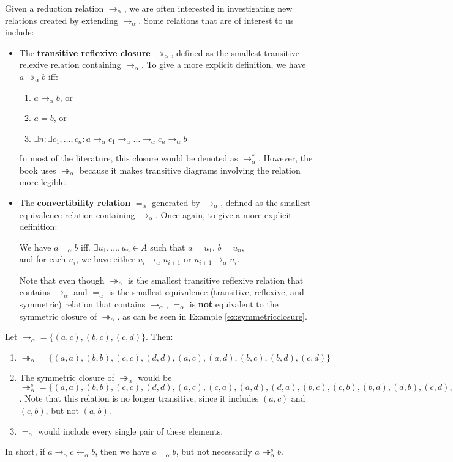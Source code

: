 \documentclass{report}
\newcommand{\trans}{\twoheadrightarrow}
\begin{document}
%
\begin{definition}
Given a reduction relation $\to_{\alpha}$, we are often interested in investigating new relations created by extending $\to_{\alpha}$. Some relations that are of interest to us include:
\begin{itemize}
 \item The \textbf{transitive reflexive closure} $\trans_\alpha$, defined as the smallest transitive relexive relation containing $\to_\alpha$. To give a more explicit definition, we have $a \twoheadrightarrow_\alpha b$ iff:
  \begin{enumerate}
   \item $a \to_\alpha b$, or
   \item $a = b$, or
   \item $\exists n : \exists c_1, \hdots, c_n : a \to_\alpha c_1 \to_\alpha \hdots \to_\alpha c_n \to_\alpha b$
  \end{enumerate}
  In most of the literature, this closure would be denoted as $\to_\alpha^*$. However, the book uses $\trans_\alpha$ because it makes transitive diagrams involving the relation more legible.\
  \item The \textbf{convertibility relation} $=_\alpha$ generated by $\to_\alpha$, defined as the smallest equivalence relation containing $\to_\alpha$. Once again, to give a more explicit definition:
  \begin{center}
   We have $a =_\alpha b$ iff. $\exists u_1, \hdots, u_n \in A$ such that $a = u_1$, $b = u_n$,\\ and for each $u_i$, we have either $u_i \to_\alpha u_{i+1}$ or $u_{i+1} \to_\alpha u_i$.
  \end{center}
  Note that even though $\trans_\alpha$ is the smallest transitive reflexive relation that contains $\to_\alpha$ and $=_\alpha$ is the smallest equivalence (transitive, reflexive, and symmetric) relation that contains $\to_\alpha$, $=_\alpha$ is \textbf{not} equivalent to the symmetric closure of $\trans_\alpha$, as can be seen in Example \ref{ex:symmetricclosure}.
\end{itemize}
%
\begin{example}
\label{ex:symmetricclosure}
Let $\to_\alpha = \{(a,c), (b,c), (c,d)\}$. Then:
\begin{enumerate}
 \item $\trans_\alpha = \{(a,a), (b,b), (c,c), (d,d), (a,c), (a,d), (b,c), (b,d), (c,d)\}$
 \item The symmetric closure of $\trans_\alpha$ would be\\ $\trans_\alpha^s = \{(a,a), (b,b), (c,c), (d,d), (a,c), (c,a), (a,d), (d,a), (b,c), (c,b), (b,d), (d,b), (c,d), (d,c)\}$. Note that this relation is no longer transitive, since it includes $(a,c)$ and $(c,b)$, but not $(a,b)$.
 \item $=_\alpha$ would include every single pair of these elements.
\end{enumerate}
In short, if $a \to_\alpha c \leftarrow_\alpha b$, then we have $a =_\alpha b$, but not necessarily $a \trans_\alpha^s b$.
\end{example}
%
\end{definition}
%
%
%
%
{}

\end{document}
